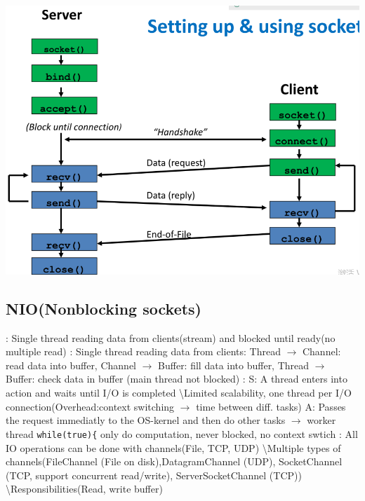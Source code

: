 \includegraphics[width=.8\linewidth]{chap1_1.png}
\subsection*{NIO(Nonblocking sockets)}
: Single thread reading data from clients(stream) and blocked until ready(no multiple read)
: Single thread reading data from clients: Thread $\rightarrow$ Channel: read data into buffer, Channel $\rightarrow$ Buffer: fill data into buffer, Thread $\rightarrow$ Buffer: check data in buffer (main thread not blocked)
: 
S: A thread enters into action and waits until I/O is completed \textbackslash Limited scalability, one thread per I/O connection(Overhead:context switching $\rightarrow$ time between diff. tasks)
A: Passes the request immediatly to the OS-kernel and then do other tasks $\rightarrow$ worker thread \lstinline{while(true){} only do computation, never blocked, no context swtich
: All IO operations can be done with channels(File, TCP, UDP) 
\textbackslash Multiple types of channels(FileChannel (File on disk),DatagramChannel (UDP), SocketChannel (TCP, support concurrent read/write), ServerSocketChannel (TCP))
\textbackslash Responsibilities(Read, write buffer)

